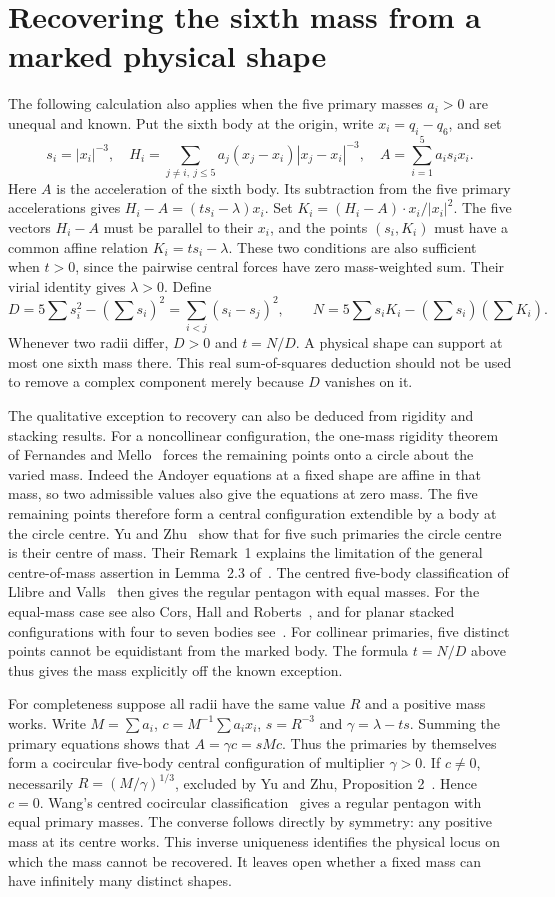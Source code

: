 \documentclass[11pt]{article}
\begin{document}
\section{Recovering the sixth mass from a marked physical shape}
The following calculation also applies when the five primary masses
$a_i>0$ are unequal and known. Put the sixth body at the origin, write
$x_i=q_i-q_6$, and set
\[
s_i=|x_i|^{-3},\quad
H_i=\sum_{j\ne i,\ j\le5}a_j(x_j-x_i)|x_j-x_i|^{-3},
\quad A=\sum_{i=1}^5 a_i s_i x_i .
\]
Here $A$ is the acceleration of the sixth body. Its subtraction from the
five primary accelerations gives
$H_i-A=(t s_i-\lambda)x_i$. Set $K_i=(H_i-A)\cdot x_i/|x_i|^2$.
The five vectors $H_i-A$ must be parallel to their $x_i$, and the
points $(s_i,K_i)$ must have a common affine relation $K_i=ts_i-\lambda$.
These two conditions are also sufficient when $t>0$, since the
pairwise central forces have zero mass-weighted sum. Their virial
identity gives $\lambda>0$. Define
\[
 D=5\sum s_i^2-(\sum s_i)^2=\sum_{i<j}(s_i-s_j)^2,\qquad
 N=5\sum s_i K_i-(\sum s_i)(\sum K_i).
\]
Whenever two radii differ, $D>0$ and $t=N/D$. A physical shape can
support at most one sixth mass there. This real sum-of-squares
deduction should not be used to remove a complex component merely because
$D$ vanishes on it.

The qualitative exception to recovery can also be deduced from rigidity
and stacking results. For a noncollinear configuration, the one-mass
rigidity theorem of Fernandes and Mello~\cite{FM} forces the remaining
points onto a circle about the varied mass. Indeed the Andoyer equations
at a fixed shape are affine in that mass, so two admissible values also
give the equations at zero mass. The five remaining points therefore form
a central configuration extendible by a body at the circle centre.
Yu and Zhu~\cite[Prop.~3(i)]{YZ} show that for five such primaries the
circle centre is their centre of mass. Their Remark~1 explains the
limitation of the general centre-of-mass assertion in Lemma~2.3 of~\cite{FM}.
The centred five-body classification of Llibre and Valls~\cite[Thm.~2]{LV}
then gives the regular pentagon with equal masses. For the equal-mass
case see also Cors, Hall and Roberts~\cite[Cor.~3.3]{CHR}, and for
planar stacked configurations with four to seven bodies see~\cite{FSV}.
For collinear primaries, five distinct points cannot be equidistant from
the marked body. The formula $t=N/D$ above thus gives the mass explicitly
off the known exception.

For completeness suppose all radii have the same value $R$ and a
positive mass works. Write $M=\sum a_i$, $c=M^{-1}\sum a_ix_i$,
$s=R^{-3}$ and $\gamma=\lambda-ts$. Summing the primary equations
shows that $A=\gamma c=sMc$. Thus the primaries by themselves form
a cocircular five-body central configuration of multiplier $\gamma>0$.
If $c\ne0$, necessarily $R=(M/\gamma)^{1/3}$, excluded by
Yu and Zhu, Proposition 2~\cite{YZ}. Hence $c=0$. Wang's centred
cocircular classification~\cite{Wang} gives a regular pentagon with
equal primary masses. The converse follows directly by symmetry:
any positive mass at its centre works. This inverse uniqueness
identifies the physical locus on which the mass cannot be recovered.
It leaves open whether a fixed mass can have infinitely many distinct
shapes.
\end{document}
